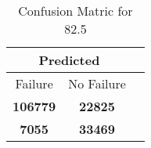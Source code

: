 \begin{table}[] 
\label{Table: Prediction Accuracy-DMD82.5OnlySunEKF-resetReflection-Reflection} 
\caption{Confusion Matric for 82.5} 
\centering 
\begin{tabular} 
 {@{}ccc@{}} 
\toprule 
\multicolumn{2}{c}{\textbf{Predicted}}
 \\ \midrule 
\multicolumn{1}{|c|}{Failure} & 
\multicolumn{1}{c|}{No Failure}
 \\ \midrule 
\multicolumn{1}{|c|}{\color{green}\textbf{106779}} & 
\multicolumn{1}{c|}{\color{red}\textbf{22825}}
 \\ \midrule 
\multicolumn{1}{|c|}{\color{red}\textbf{7055}} & 
\multicolumn{1}{c|}{\color{green}\textbf{33469}}
 \\ \bottomrule 
\end{tabular} 
\end{table} 
